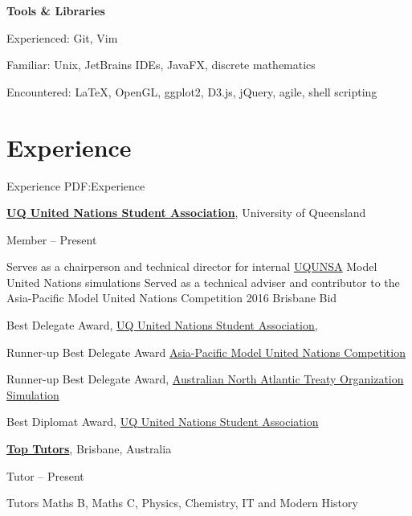 \documentclass[a4paper,10pt,oneside]{article}
\begin{document}
\begin{body}
\EntryGap

\textbf{Tools \& Libraries}
\par Experienced: Git, Vim
\par Familiar: Unix, JetBrains IDEs, JavaFX, discrete mathematics
\par Encountered: \LaTeX, OpenGL, ggplot2, D3.js, jQuery, agile, shell scripting


\section
{Experience}
{Experience}
{PDF:Experience}

\href{http://www.unsauq.org/}
{\textbf{UQ United Nations Student Association}}, University of Queensland

\par Member \hfill {} -- Present

\begin{detail}
\BulletItem Serves as a chairperson and technical director for internal \href{http://www.unsauq.org/}{UQUNSA} Model United Nations simulations 
\BulletItem Served as a technical adviser and contributor to the Asia-Pacific Model United Nations Competition 2016 Brisbane Bid
\end{detail}

\par Best Delegate Award, \href{http://www.unsauq.org/}{UQ United Nations Student Association}, \hfill {}
\par Runner-up Best Delegate Award \href{http://www.amunc.net/}{Asia-Pacific Model United Nations Competition} \hfill {}
\par Runner-up Best Delegate Award, \href{http://www.ausnatos.org/}{Australian North Atlantic Treaty Organization Simulation} \hfill {}
\par Best Diplomat Award, \href{http://www.unsauq.org/}{UQ United Nations Student Association} \hfill {}

\EntryGap

\href{https://www.toptutors.com.au/}{\textbf{Top Tutors}}, Brisbane, Australia
\par Tutor \hfill {} -- Present
\begin{detail}
Tutors Maths B, Maths C, Physics, Chemistry, IT and Modern History
\end{detail}


\end{body}
\end{document}

